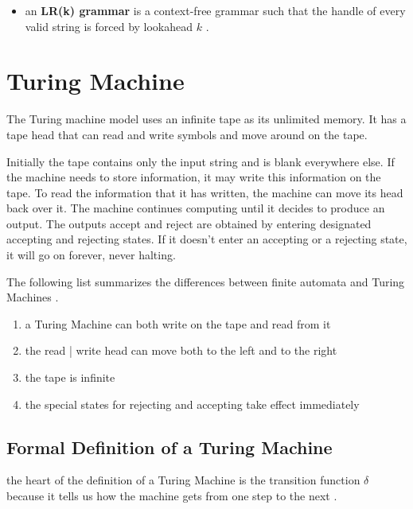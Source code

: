 \documentclass[12pt]{article}
\begin{document}
\begin{tcolorbox}
\begin{itemize}
	\item an \textbf{LR(k) grammar} is a context-free grammar such that the handle of every valid string is forced by lookahead $k$ .
\end{itemize}
\end{tcolorbox}




\section{Turing Machine}

The Turing machine model uses an infinite tape as its unlimited memory. It
has a tape head that can read and write symbols and move around on the tape.

\noindent
Initially the tape contains only the input string and is blank everywhere else. If
the machine needs to store information, it may write this information on the
tape. To read the information that it has written, the machine can move its
head back over it. The machine continues computing until it decides to produce
an output. The outputs accept and reject are obtained by entering designated
accepting and rejecting states. If it doesn’t enter an accepting or a rejecting state,
it will go on forever, never halting.

The following list summarizes the differences between finite automata and
Turing Machines .


\begin{enumerate}
	\item a Turing Machine can both write on the tape and read from it
	\item the read | write head can move both to the left and to the right 
	\item the tape is infinite
	\item the special states for rejecting and accepting take effect immediately
\end{enumerate}



\subsection{Formal Definition of a Turing Machine}

the heart of the definition of a Turing Machine is the transition function $\delta$ because it tells us how the machine gets from one step to the next . 
\end{document}
